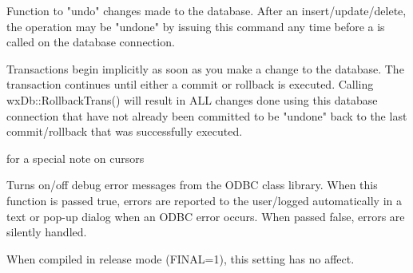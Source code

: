 Function to "undo" changes made to the database.  After an insert/update/delete, the operation may be "undone" by issuing this command any time before a  is called on the database connection.


Transactions begin implicitly as soon as you make a change to the database.  The
transaction continues until either a commit or rollback is executed.  Calling
wxDb::RollbackTrans() will result in ALL changes done using this database
connection that have not already been committed to be "undone" back to the last
commit/rollback that was successfully executed.



 for a special note on cursors

\label{wxdbsetdebugerrormessages}




Turns on/off debug error messages from the ODBC class library.  When
this function is passed true, errors are reported to the user/logged automatically
in a text or pop-up dialog when an ODBC error occurs.  When passed false,
errors are silently handled.

When compiled in release mode (FINAL=1), this setting has no affect.



\label{wxdbsetsqllogging}




